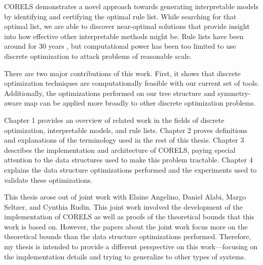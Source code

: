 CORELS demonstrates a novel approach towards generating interpretable models by identifying and certifying the optimal rule list. 
While searching for that optimal list, we are able to discover near-optimal solutions that provide insight into how effective other interpretable methods might be. 
Rule lists have been around for 30 years \cite{Rivest87}, but computational power has been too limited to use discrete optimization to attack problems of reasonable scale.

There are two major contributions of this work.
First, it shows that discrete optimization techniques are computationally feasible with our current set of tools.
Additionally, the optimizations performed on our tree structure and symmetry-aware map can be applied more broadly to other discrete optimization problems.

Chapter 1 provides an overview of related work in the fields of discrete optimization, interpretable models, and rule lists. 
Chapter 2 proves definitions and explanations of the terminology used in the rest of this thesis.
Chapter 3 describes the implementation and architecture of CORELS, paying special attention to the data structures used to make this problem tractable.
Chapter 4 explains the data structure optimizations performed and the experiments used to validate these optimizations.

\newpage

This thesis arose out of joint work with Elaine Angelino, Daniel Alabi, Margo Seltzer, and Cynthia Rudin.
This joint work involved the development of the implementation of CORELS as well as proofs of the theoretical bounds that this work is based on.
However, the papers about the joint work focus more on the theoretical bounds than the data structure optimizations performed.
Therefore, my thesis is intended to provide a different perspective on this work---focusing on the implementation details and trying to generalize to other types of systems.